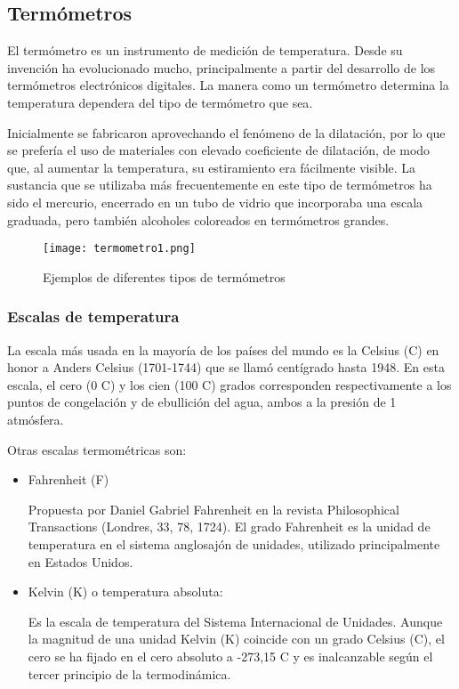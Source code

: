 \subsection{Termómetros}

\par 
El termómetro es un instrumento de medición de temperatura. Desde su invención ha evolucionado mucho, principalmente a partir del desarrollo de los termómetros electrónicos digitales. La manera como un termómetro determina la temperatura dependera del tipo de termómetro que sea\cite{termometro}. 

\par \noindent
Inicialmente se fabricaron aprovechando el fenómeno de la dilatación, por lo que se prefería el uso de materiales con elevado coeficiente de dilatación, de modo que, al aumentar la temperatura, su estiramiento era fácilmente visible. La sustancia que se utilizaba más frecuentemente en este tipo de termómetros ha sido el mercurio, encerrado en un tubo de vidrio que incorporaba una escala graduada, pero también alcoholes coloreados en termómetros grandes\cite{termometro}.

\begin{figure}[H]
	\centering
	\texttt{[image: termometro1.png]}
	\caption{Ejemplos de diferentes tipos de termómetros}
\end{figure}

\subsubsection{Escalas de temperatura \cite{termometro}}

\par 
La escala más usada en la mayoría de los países del mundo es la Celsius (\textdegree{}C) en honor a Anders Celsius (1701-1744) que se llamó centígrado hasta 1948. En esta escala, el cero (0 \textdegree{}C) y los cien (100 \textdegree{}C) grados corresponden respectivamente a los puntos de congelación y de ebullición del agua, ambos a la presión de 1 atmósfera.

\par \noindent 
Otras escalas termométricas son:

\begin{itemize}
	
\item Fahrenheit (\textdegree{}F) 

Propuesta por Daniel Gabriel Fahrenheit en la revista Philosophical Transactions (Londres, 33, 78, 1724). El grado Fahrenheit es la unidad de temperatura en el sistema anglosajón de unidades, utilizado principalmente en Estados Unidos.

\item Kelvin (K) o temperatura absoluta: 

Es la escala de temperatura del Sistema Internacional de Unidades. Aunque la magnitud de una unidad Kelvin (K) coincide con un grado Celsius (\textdegree{}C), el cero se ha fijado en el cero absoluto a -273,15 \textdegree{}C y es inalcanzable según el tercer principio de la termodinámica.
\end{itemize}


